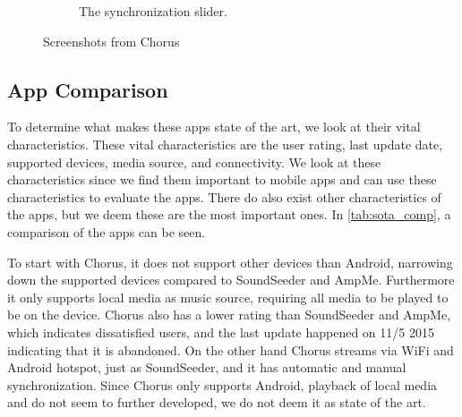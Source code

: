 \begin{figure}[h!]
\begin{subfigure}[b]{0.45\textwidth}
        \caption{The synchronization slider.}\label{fig:chorus_slider}
    \end{subfigure}
    \caption{Screenshots from Chorus}\label{fig:chorus_screenshots}
\end{figure}

\subsection{App Comparison}\label{ssec:app_comparison}
To determine what makes these apps state of the art,
we look at their vital characteristics.
These vital characteristics are the user rating, last update date, supported devices, media source, and connectivity.
We look at these characteristics since we find them important to mobile apps and can use these characteristics to evaluate the apps.
There do also exist other characteristics of the apps, but we deem these are the most important ones.
In \cref{tab:sota_comp}, a comparison of the apps can be seen.

To start with Chorus, it does not support other devices than Android, narrowing down the supported devices compared to SoundSeeder and AmpMe.
Furthermore it only supports local media as music source, requiring all media to be played to be on the device.
Chorus also has a lower rating than SoundSeeder and AmpMe, which indicates dissatisfied users,
and the last update happened on 11/5 2015 indicating that it is abandoned.
On the other hand Chorus streams via WiFi and Android hotspot, just as SoundSeeder, and it has automatic and manual synchronization.
Since Chorus only supports Android, playback of local media and do not seem to further developed,
we do not deem it as state of the art.

